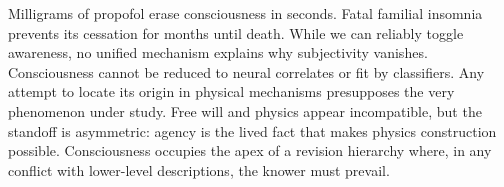 Milligrams of propofol erase consciousness in seconds. Fatal familial insomnia prevents its cessation for months until death. While we can reliably toggle awareness, no unified mechanism explains why subjectivity vanishes. Consciousness cannot be reduced to neural correlates or fit by classifiers. Any attempt to locate its origin in physical mechanisms presupposes the very phenomenon under study. Free will and physics appear incompatible, but the standoff is asymmetric: agency is the lived fact that makes physics construction possible. Consciousness occupies the apex of a revision hierarchy where, in any conflict with lower-level descriptions, the knower must prevail.